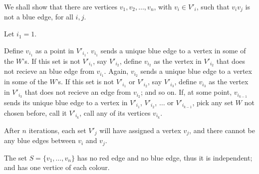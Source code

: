 \documentclass[10pt, a4paper]{article}
\begin{document}
\begin{sol}
\begin{dem}
		We shall show that there are vertices $v_1, v_2, \dots, v_{n}$, with $v_i \in V'_i$, such that  $v_iv_j$ is not a blue edge, for all $i, j$.

		\begin{dem}
		Let $i_1 = 1$.

		Define $v_{i_1}$ as a point in $V'_{i_1}$. $v_{i_1}$ sends a unique blue edge to a vertex in some of the $W$'s. If this set is not $V'_{i_1}$, say $V'_{i_2}$, define $v_{i_2}$ as the vertex in $V'_{i_2}$ that does not recieve an blue edge from $v_{i_1}$. Again, $v_{i_2}$ sends a unique blue edge to a vertex in some of the $W$'s. If this set is not $V'_{i_1}$ or $V'_{i_2}$, say $V'_{i_3}$, define $v_{i_3}$ as the vertex in $V'_{i_3}$ that does not recieve an edge from $v_{i_2}$; and so on. If, at some point, $v_{i_{k-1}}$ sends its unique blue edge to a vertex in $V'_{i_1}$, $V'_{i_2}$, $\dots$ or $V'_{i_{k-1}}$, pick any set $W$ not chosen before, call it $V'_{i_k}$, call any of its vertices $v_{i_k}$.
		
		After $n$ iterations, each set $V'_j$ will have assigned a vertex $v_j$, and there cannot be any blue edges between $v_i$ and $v_j$.
		\end{dem}

		The set $S = \{v_1, \dots, v_n\}$ has no red edge and no blue edge, thus it is independent; and has one vertice of each colour.

	\end{dem}
\end{sol}
\end{document}
